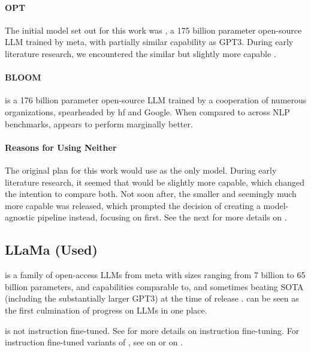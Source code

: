 \paragraph{OPT}\label{par:opt}\label{sub:OPT}
The initial model set out for this work was  \cite{zhang_opt_2022}, a 175 billion parameter open-source \gls{LLM} trained by \gls{meta}, with partially similar capability as \gls{GPT3}. During early literature research, we encountered the similar but slightly more capable .

\paragraph{BLOOM}\label{par:bloom}\label{sub:BLOOM}
 \cite{workshop_bloom_2022} is a 176 billion parameter open-source \gls{LLM} trained by a cooperation of numerous organizations, spearheaded by \gls{hf} and \gls{Google}. When compared to  across \gls{NLP} benchmarks,  appears to perform marginally better.

\paragraph{Reasons for Using Neither}
The original plan for this work would use  as the only model. During early literature research, it seemed that  would be slightly more capable, which changed the intention to compare both.
Not soon after, the smaller and seemingly much more capable  was released, which prompted the decision of creating a model-agnostic pipeline instead, focusing on  first.
See the next  for more details on .

\subsection{LLaMa (Used)}\label{sub:llama}
 is a family of open-access \glspl{LLM} from \gls{meta} with sizes ranging from 7 billion to 65 billion parameters, and capabilities comparable to, and sometimes beating \gls{SOTA} (including the substantially larger \gls{GPT3}) at the time of release \cite{touvron_llama_2023}.
 can be seen as the first culmination of progress on \glspl{LLM} in one place.

 is not instruction fine-tuned. See  for more details on instruction fine-tuning.
For instruction fine-tuned variants of , see  on  or  on .

